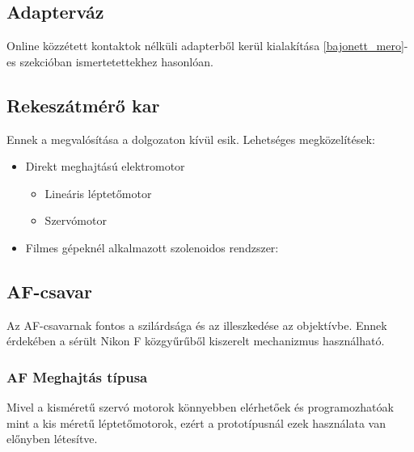 \subsection{Adapterváz}
Online közzétett kontaktok nélküli adapterből kerül kialakítása \ref{bajonett_mero}-es szekcióban ismertetettekhez hasonlóan.
\subsection{Rekeszátmérő kar}
Ennek a megvalósítása a dolgozaton kívül esik.
Lehetséges megközelítések:
\begin{itemize}
    \item Direkt meghajtású elektromotor
    \begin{itemize}
        \item Lineáris léptetőmotor
        \item Szervómotor
    \end{itemize}
    \item Filmes gépeknél alkalmazott szolenoidos rendzszer:
    \begin{figure}[h]
        [INSERT FIGURE HERE]
    \end{figure}
\end{itemize}
\subsection{AF-csavar}
Az AF-csavarnak fontos a szilárdsága és az illeszkedése az objektívbe.
Ennek érdekében a sérült Nikon F közgyűrűből kiszerelt mechanizmus használható.
\subsubsection{AF Meghajtás típusa} %
Mivel a kisméretű szervó motorok könnyebben elérhetőek és programozhatóak mint a kis méretű léptetőmotorok, ezért a prototípusnál ezek használata van előnyben létesítve.
